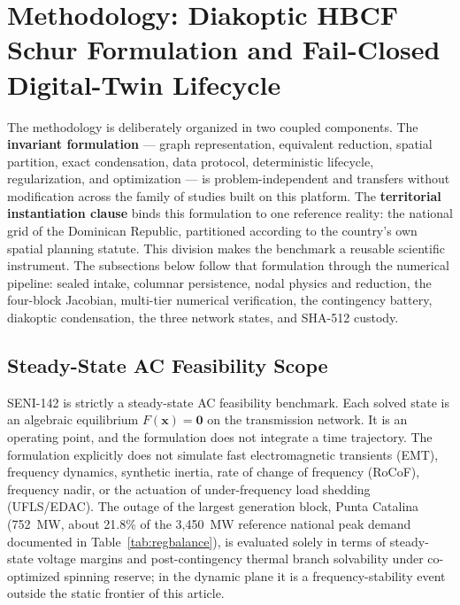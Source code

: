 \section{Methodology: Diakoptic HBCF Schur Formulation and Fail-Closed Digital-Twin Lifecycle}
\label{sec:methodology}

The methodology is deliberately organized in two coupled components. The \textbf{invariant formulation} --- graph representation, equivalent reduction, spatial partition, exact condensation, data protocol, deterministic lifecycle, regularization, and optimization --- is problem-independent and transfers without modification across the family of studies built on this platform. The \textbf{territorial instantiation clause} binds this formulation to one reference reality: the national grid of the Dominican Republic, partitioned according to the country's own spatial planning statute. This division makes the benchmark a reusable scientific instrument. The subsections below follow that formulation through the numerical pipeline: sealed intake, columnar persistence, nodal physics and reduction, the four-block Jacobian, multi-tier numerical verification, the contingency battery, diakoptic condensation, the three network states, and SHA-512 custody.

\subsection{Steady-State AC Feasibility Scope}
\label{sub:scope}

SENI-142 is strictly a steady-state AC feasibility benchmark. Each solved state is an algebraic equilibrium $F(\mathbf{x})=\mathbf{0}$ on the transmission network. It is an operating point, and the formulation does not integrate a time trajectory. The formulation explicitly does not simulate fast electromagnetic transients (EMT), frequency dynamics, synthetic inertia, rate of change of frequency (RoCoF), frequency nadir, or the actuation of under-frequency load shedding (UFLS/EDAC). The outage of the largest generation block, Punta Catalina (752~MW, about 21.8\% of the 3,450~MW reference national peak demand documented in Table~\ref{tab:regbalance}), is evaluated solely in terms of steady-state voltage margins and post-contingency thermal branch solvability under co-optimized spinning reserve; in the dynamic plane it is a frequency-stability event outside the static frontier of this article.

